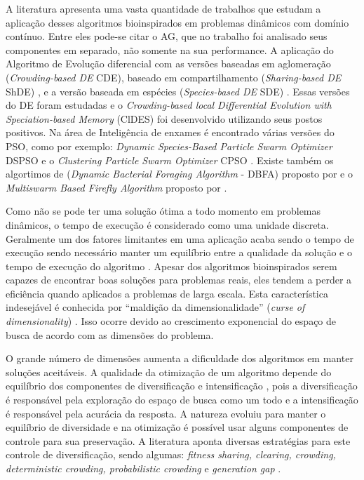 A literatura apresenta uma vasta quantidade de trabalhos que estudam a aplicação desses algoritmos bioinspirados em problemas dinâmicos com domínio contínuo. Entre eles pode-se citar o AG, que no trabalho \cite{rand2005measurements} foi analisado seus componentes em separado, não somente na sua performance. A aplicação do Algoritmo de Evolução diferencial com as versões baseadas em aglomeração (\textit{Crowding-based DE} CDE), baseado em compartilhamento (\textit{Sharing-based DE} ShDE) \cite{thomsen2004multimodal}, e a versão baseada em espécies (\textit{Species-based DE} SDE) \cite{li2005efficient}. Essas versões do DE foram estudadas e o \textit{Crowding-based local Differential Evolution with Speciation-based Memory} (ClDES) foi desenvolvido utilizando seus postos positivos. Na área de Inteligência de enxames é encontrado várias versões do PSO, como por exemplo: \textit{Dynamic Species-Based Particle Swarm Optimizer} DSPSO \cite{parrott2006locating} e o \textit{Clustering Particle Swarm Optimizer} CPSO \cite{yang2010clustering}. Existe também os algortimos de (\textit{Dynamic Bacterial Foraging Algorithm} - DBFA) proposto por \cite{passino2002biomimicry} e o \textit{Multiswarm Based Firefly Algorithm} proposto por \cite{farahani2011multiswarm}.

Como não se pode ter uma solução ótima a todo momento em problemas dinâmicos, o tempo de execução é considerado como uma unidade discreta. Geralmente um dos fatores limitantes em uma aplicação acaba sendo o tempo de execução sendo necessário manter um equilíbrio entre a qualidade da solução e o tempo de execução do algoritmo \cite{li2006new}. Apesar dos algoritmos bioinspirados serem capazes de encontrar boas soluções para problemas reais, eles tendem a perder a eficiência quando aplicados a problemas de larga escala. Esta característica indesejável é conhecida por “maldição da dimensionalidade” (\textit{curse of dimensionality}) \cite{bellman2015applied}. Isso ocorre devido ao crescimento exponencial do espaço de busca de acordo com as dimensões do problema.

O grande número de dimensões aumenta a dificuldade dos algoritmos em manter soluções aceitáveis. A qualidade da otimização de um algoritmo depende do equilíbrio dos componentes de diversificação e intensificação \cite{boussaid2013survey}, pois a diversificação é responsável pela exploração do espaço de busca como um todo e a intensificação é responsável pela acurácia da resposta. A natureza evoluiu para manter o equilíbrio de diversidade e na otimização é possível usar alguns componentes de controle para sua preservação. A literatura aponta diversas estratégias para este controle de diversificação, sendo algumas: \textit{fitness sharing, clearing, crowding, deterministic crowding, probabilistic crowding} e \textit{generation gap} \cite{andre2015multiple}.

